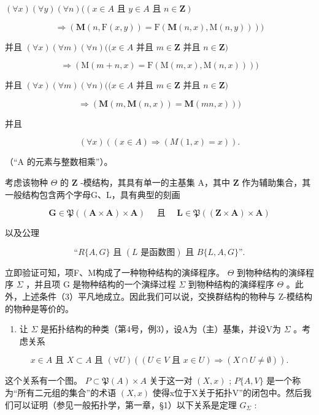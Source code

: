 \((\forall x)(\forall y)(\forall n)((x \in A \text{ 且 } y \in A \text{ 且 } n \in \mathbf{Z})\)

\[
\Longrightarrow (\mathbf {M} (n, \mathrm{F} (x, y)) = \mathrm{F} (\mathbf {M} (n, x), \mathrm{M} (n, y))))
\]

并且 \((\forall x)(\forall m)(\forall n)((x\in A\) 并且 \(m\in \mathbf{Z}\) 并且 \(n\in \mathbf{Z})\)

\[
\Rightarrow (\mathrm{M} (m + n, x) = \mathrm{F} (\mathrm{M} (m, x), \mathrm{M} (n, x))))
\]

并且 \((\forall x)(\forall m)(\forall n)((x\in A\) 并且 \(m\in \mathbf{Z}\) 并且 \(n\in \mathbf{Z})\)

\[
\Longrightarrow (\mathbf {M} (m, \mathbf {M} (n, x)) = \mathbf {M} (m n, x)))
\]

并且

\[
(\forall x) ((x \in A) \Longrightarrow (M (1, x) = x)).
\]

（“A 的元素与整数相乘”）。

考虑该物种 \(\Theta\) 的 \(\mathbf{Z}\) -模结构，其具有单一的主基集 A，其中 \(\mathbf{Z}\) 作为辅助集合，其一般结构包含两个字母G、L，具有典型的刻画

\[
\mathbf {G} \in \mathfrak {P} ((\mathbf {A} \times \mathbf {A}) \times \mathbf {A}) \quad \text { 且 } \quad \mathbf {L} \in \mathfrak {P} ((\mathbf {Z} \times \mathbf {A}) \times \mathbf {A})
\]

以及公理

\[
\text{``}R\{A,G\}\text{ 且 }(L\text{ 是函数图})\text{ 且 }B\{L,A,G\}\text{''.}
\]

立即验证可知，项F、M构成了一种物种结构的演绎程序。 \(\Theta\) 到物种结构的演绎程序 \(\Sigma\) ，并且项 G 是物种结构的一个演绎过程 \(\Sigma\) 到物种结构的演绎程序 \(\Theta\) 。此外，上述条件（3）平凡地成立。因此我们可以说，交换群结构的物种与 Z-模结构的物种是等价的。

\begin{enumerate}
\def\labelenumi{(\arabic{enumi})}
\setcounter{enumi}{1}
\tightlist
\item
  让 \(\Sigma\) 是拓扑结构的种类（第4号，例3），设A为（主）基集，并设V为 \(\Sigma\) 。考虑关系
\end{enumerate}

\[
x \in A \text {   且   } X \subset A \text {   且   } (\forall U) ((U \in V \text {   且   } x \in U) \Longrightarrow (X \cap U \neq \emptyset)).
\]

这个关系有一个图。 \(P \subset \mathfrak{P}(A) \times A\) 关于这一对 \((X, x)\) ; \(P\{A, V\}\) 是一个称为“所有二元组的集合”的术语 \((X, x)\) 使得x位于X关于拓扑V''的闭包中。然后我们可以证明（参见一般拓扑学，第一章，§1）以下关系是定理 \(G_{\Sigma}\) :

